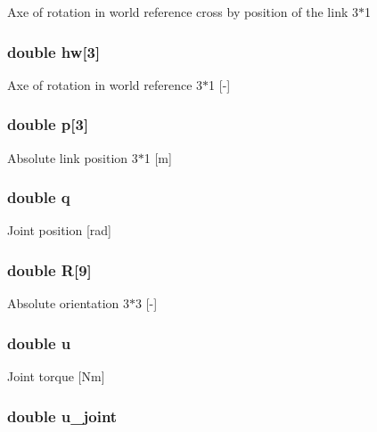 Axe of rotation in world reference cross by position of the link 3$\ast$1 \hypertarget{struct_save_l_i_n_k_a66047441f6f822ad4e7063f9bb4a4a3b}{
\subsubsection[{hw}]{\setlength{\rightskip}{0pt plus 5cm}double hw\mbox{[}3\mbox{]}}}\label{struct_save_l_i_n_k_a66047441f6f822ad4e7063f9bb4a4a3b}
Axe of rotation in world reference 3$\ast$1 \mbox{[}-\/\mbox{]} \hypertarget{struct_save_l_i_n_k_a9f2a829150c5753f56e91e5e3d9f6677}{
\subsubsection[{p}]{\setlength{\rightskip}{0pt plus 5cm}double p\mbox{[}3\mbox{]}}}\label{struct_save_l_i_n_k_a9f2a829150c5753f56e91e5e3d9f6677}
Absolute link position 3$\ast$1 \mbox{[}m\mbox{]} \hypertarget{struct_save_l_i_n_k_a5b5e3f03e443adea974601f295136638}{
\subsubsection[{q}]{\setlength{\rightskip}{0pt plus 5cm}double q}}\label{struct_save_l_i_n_k_a5b5e3f03e443adea974601f295136638}
Joint position \mbox{[}rad\mbox{]} \hypertarget{struct_save_l_i_n_k_ae9c91fd01a63a2b635a1796a4b713b86}{
\subsubsection[{R}]{\setlength{\rightskip}{0pt plus 5cm}double R\mbox{[}9\mbox{]}}}\label{struct_save_l_i_n_k_ae9c91fd01a63a2b635a1796a4b713b86}
Absolute orientation 3$\ast$3 \mbox{[}-\/\mbox{]} \hypertarget{struct_save_l_i_n_k_aed08c8478a62910aab06ba708a0e5b5f}{
\subsubsection[{u}]{\setlength{\rightskip}{0pt plus 5cm}double u}}\label{struct_save_l_i_n_k_aed08c8478a62910aab06ba708a0e5b5f}
Joint torque \mbox{[}Nm\mbox{]} \hypertarget{struct_save_l_i_n_k_a4c825b6298857a29278ccd8a7b731863}{
\subsubsection[{u\-\_\-joint}]{\setlength{\rightskip}{0pt plus 5cm}double u\-\_\-joint}}\label{struct_save_l_i_n_k_a4c825b6298857a29278ccd8a7b731863}
